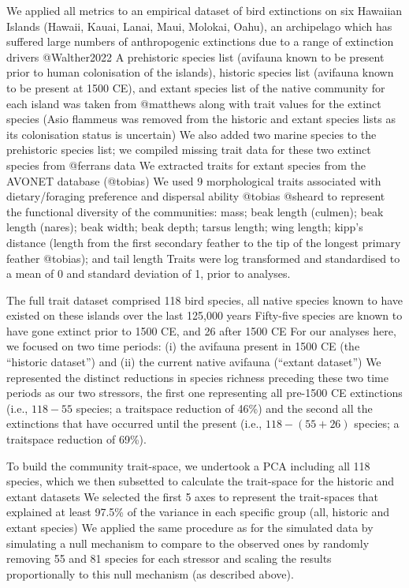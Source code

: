 \documentclass[12pt,letterpaper]{article}
\begin{document}
We applied all metrics to an empirical dataset of bird extinctions on six Hawaiian Islands (Hawaii, Kauai, Lanai, Maui, Molokai, Oahu), an archipelago which has suffered large numbers of anthropogenic extinctions due to a range of extinction drivers @Walther2022
A prehistoric species list (avifauna known to be present prior to human colonisation of the islands), historic species list (avifauna known to be present at 1500 CE), and extant species list of the native community for each island was taken from @matthews along with trait values for the extinct species (Asio flammeus was removed from the historic and extant species lists as its colonisation status is uncertain)
We also added two marine species to the prehistoric species list; we compiled missing trait data for these two extinct species from @ferrans data
We extracted traits for extant species from the AVONET database (@tobias)
We used 9 morphological traits associated with dietary/foraging preference and dispersal ability @tobias @sheard to represent the functional diversity of the communities: mass; beak length (culmen); beak length (nares); beak width; beak depth; tarsus length; wing length; kipp’s distance (length from the first secondary feather to the tip of the longest primary feather @tobias); and tail length
Traits were log transformed and standardised to a mean of 0 and standard deviation of 1, prior to analyses.

The full trait dataset comprised 118 bird species, all native species known to have existed on these islands over the last 125,000 years
Fifty-five species are known to have gone extinct prior to 1500 CE, and 26 after 1500 CE
For our analyses here, we focused on two time periods: (i) the avifauna present in 1500 CE (the ``historic dataset'') and (ii) the current native avifauna (``extant dataset'')
We represented the distinct reductions in species richness preceding these two time periods as our two stressors, the first one representing all pre-1500 CE extinctions (i.e., $118-55$ species; a traitspace reduction of 46\%) and the second all the extinctions that have occurred until the present (i.e., $118-(55+26)$ species; a traitspace reduction of 69\%).

To build the community trait-space, we undertook a PCA including all 118 species, which we then subsetted to calculate the trait-space for the historic and extant datasets
We selected the first 5 axes to represent the trait-spaces that explained at least 97.5\% of the variance in each specific group (all, historic and extant species)
We applied the same procedure as for the simulated data by simulating a null mechanism to compare to the observed ones by randomly removing 55 and 81 species for each stressor and scaling the results proportionally to this null mechanism (as described above).
\end{document}

